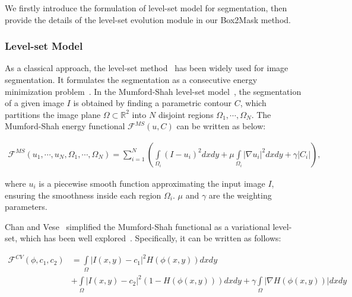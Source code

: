 \documentclass[12pt,onecolumn,letterpaper]{article}
\begin{document}
We firstly introduce the formulation of level-set model for segmentation, then provide the details of the level-set evolution module in our Box2Mask method.

\subsubsection{Level-set Model}
As a classical approach, the level-set method~\cite{levelset1995a, osher1988fronts} has been widely used for image segmentation. It formulates the segmentation as a consecutive energy minimization problem~\cite{mumford1989optimal, tip2001_active_contour, ijcv2002multiphase}.
In the Mumford-Shah level-set model~\cite{mumford1989optimal}, the segmentation of a given image $I$ is obtained by finding a parametric contour $C$, which partitions the image plane $\Omega \subset \mathbb{R}^2$ into $N$ disjoint regions ${\Omega _1}, \cdots ,{\Omega _N}$. The Mumford-Shah energy functional $\mathcal{F}^{MS}(u ,C)$ can be written as below:
\begin{normalsize}
	\begin{equation} \label{eq2}
		\begin{aligned}
			{\mathcal{F}^{MS}}({u_1}, \! \cdots, \! {u_N}, \! {\Omega _1}, \! \cdots , \! {\Omega _N}) 
			 = \sum\limits_{i = 1}^N {(\! \int\limits_{{\Omega _i}} {{{(\! I - \! {u_i})}^2}} dxdy + \! \mu \! \int\limits_{{\Omega _i}} {{{\left| {\nabla {u_i}} \right|}^2}dxdy \! + \! \gamma \! \left| {{C_i}} \right|})}, 
		\end{aligned}
	\end{equation}
\end{normalsize}

\noindent where $u_i$ is a piecewise smooth function approximating the input image $I$, ensuring the smoothness inside each region ${\Omega _i}$. $\mu$ and $\gamma$ are the weighting parameters.

Chan and Vese~\cite{tip2001_active_contour} simplified the Mumford-Shah functional as a variational level-set, which has been well explored~\cite{wang2010efficient,liu2012local,mavska2013segmentation,xu2011image}. Specifically, it can be written as follows:
\begin{normalsize}
	\begin{equation} \label{eq3}
		\begin{aligned} 
			{\mathcal{F}^{CV}}(\phi ,{c_1},{c_2}) &= \int\limits_\Omega  {{{\left| {I(x,y) - {c_1}} \right|}^2}H(\phi (x,y))} dxdy \\ & + \int\limits_\Omega  {{{\left| {I(x,y) - {c_2}} \right|}^2}(1 - H(\phi (x,y)))} dxdy  +  \gamma \int\limits_\Omega  {\left| {\nabla H(\phi (x,y))} \right|dxdy} 
		\end{aligned}
	\end{equation}
\end{normalsize}
\end{document}
